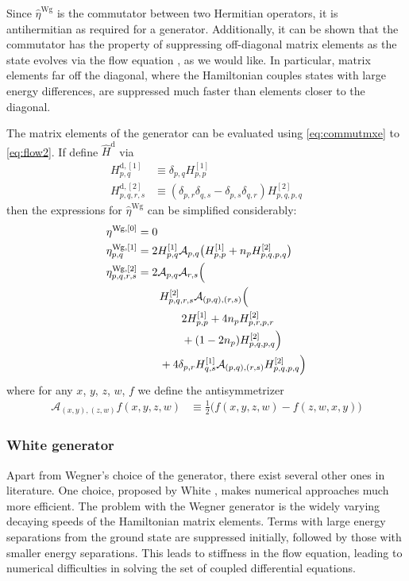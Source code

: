Since $\hat{\eta}^{\text{Wg}}$ is the commutator between two Hermitian operators, it is antihermitian as required for a generator.  Additionally, it can be shown that the commutator has the property of suppressing off-diagonal matrix elements as the state evolves via the flow equation \cite{kehrein2006flow}, as we would like.  In particular, matrix elements far off the diagonal, where the Hamiltonian couples states with large energy differences, are suppressed much faster than elements closer to the diagonal.

The matrix elements of the generator can be evaluated using \eqref{eq:commutmxe} to \eqref{eq:flow2}.  If define $\hat{H}^{\text{d}}$ via
\begin{align*}
  H^{\text{d}, [1]}_{p, q} &\equiv \delta_{p, q} H^{[1]}_{p, p} \\
  H^{\text{d}, [2]}_{p, q, r, s} &\equiv (\delta_{p, r} \delta_{q, s} - \delta_{p, s} \delta_{q, r}) H^{[2]}_{p, q, p, q}
\end{align*}
then the expressions for $\hat{\eta}^{\text{Wg}}$ can be simplified considerably:
\begin{align*}
  \eta^{\text{Wg},[0]} &= 0 \\
  \eta^{\text{Wg},[1]}_{p, q} &= 2 H^{[1]}_{p, q} \mathcal{A}_{p, q} \bigl( H^{[1]}_{p, p} + n_p H^{[2]}_{p, q, p, q} \bigr) \\
  \eta^{\text{Wg},[2]}_{p, q, r, s} &= 2 \mathcal{A}_{p, q} \mathcal{A}_{r, s} \Big( \\
  &\qquad H^{[2]}_{p, q, r, s} \mathcal{A}_{(p, q), (r, s)} \Bigl(\\
  &\qquad \qquad 2 H^{[1]}_{p, p} + 4 n_p H^{[2]}_{p, r, p, r} \\
  &\qquad \qquad + (1 - 2 n_p) H^{[2]}_{p, q, p, q} \Bigr) \\
  &\qquad + 4 \delta_{p, r} H^{[1]}_{q, s} \mathcal{A}_{(p, q), (r, s)} H^{[2]}_{p, q, p, q}
  \Bigr)
\end{align*}
where for any $x$, $y$, $z$, $w$, $f$ we define the antisymmetrizer
\begin{align*}
  \mathcal{A}_{(x, y), (z, w)} f(x, y, z, w) &\equiv \frac{1}{2} \bigl(f(x, y, z, w) - f(z, w, x, y)\bigr)
\end{align*}

\subsubsection{White generator}
\label{subsec:White}

Apart from Wegner's choice of the generator, there exist several other ones in literature. One choice, proposed by White \cite{White:cond-mat0201346}, makes numerical approaches much more efficient.  The problem with the Wegner generator is the widely varying decaying speeds of the Hamiltonian matrix elements.  Terms with large energy separations from the ground state are suppressed initially, followed by those with smaller energy separations.  This leads to stiffness in the flow equation, leading to numerical difficulties in solving the set of coupled differential equations.


